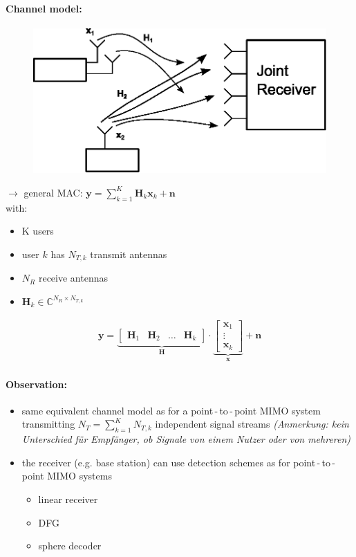 \documentclass[a4paper, 10pt]{article}
\begin{document}
\paragraph*{Channel model:}
\begin{figure}[h]\centering
	\includegraphics[scale=0.8]{Detector_Structures_Channel_Model}
\end{figure}
$\rightarrow  $ general MAC: $\mathbf{y} = \sum\limits_{k = 1}^{K}\mathbf{H}_k\mathbf{x}_k + \mathbf{n} $\\
with: \begin{itemize}
	\item K users
	\item user $k $ has $N_{T,k} $ transmit antennas
	\item $N_R $ receive antennas
	\item $\mathbf{H}_k \in \mathbb{C}^{N_R\times N_{T,k}} $ 
\end{itemize}
\begin{align*}
	\mathbf{y} = 
	\underbrace{
	\begin{bmatrix}\mathbf{H}_1 & \mathbf{H}_2 & \ldots & \mathbf{H}_k 	
	\end{bmatrix}
	}_{\mathbf{H}}\cdot
	\underbrace{
	\begin{bmatrix}\mathbf{x}_1 \\ \vdots \\ \mathbf{x}_k		
	\end{bmatrix}}_{\mathbf{x}} + \mathbf{n}
\end{align*}
\paragraph*{Observation:}
\begin{itemize}
	\item same equivalent channel model as for a point\,-\,to\,-\,point MIMO system transmitting $N_T = \sum_{k = 1}^{K} N_{T,k} $ independent signal streams \quad \textit{(Anmerkung: kein Unterschied f\"ur Empf\"anger, ob Signale von einem Nutzer oder von mehreren)}
	\item the receiver (e.g. base station) can use detection schemes as for point\,-\,to\,-\,point MIMO systems
	\begin{itemize}
		\item linear receiver
		\item DFG
		\item sphere decoder
	\end{itemize}
\end{itemize}
\end{document}
